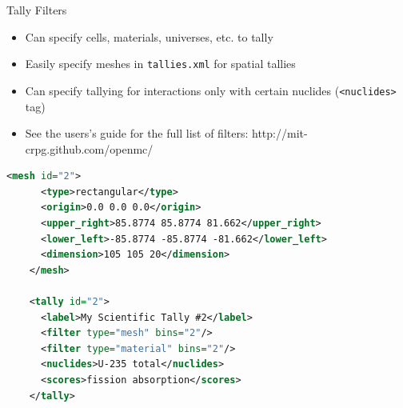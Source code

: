 \documentclass[serif]{beamer}
\begin{document}

\begin{frame}[fragile]{Tally Filters}

  \begin{itemize}
    \item Can specify cells, materials, universes, etc. to tally
    \item Easily specify meshes in \verb|tallies.xml| for spatial tallies
    \item Can specify tallying for interactions only with certain nuclides (\verb|<nuclides>| tag)
    \item See the users's guide for the full list of filters: http://mit-crpg.github.com/openmc/
  \end{itemize}

  \begin{scriptsize}
    \begin{lstlisting}[language=XML,gobble=4]
    <mesh id="2">
      <type>rectangular</type>
      <origin>0.0 0.0 0.0</origin>
      <upper_right>85.8774 85.8774 81.662</upper_right>
      <lower_left>-85.8774 -85.8774 -81.662</lower_left>
      <dimension>105 105 20</dimension>
    </mesh>
    
    <tally id="2">
      <label>My Scientific Tally #2</label>
      <filter type="mesh" bins="2"/>
      <filter type="material" bins="2"/>
      <nuclides>U-235 total</nuclides>
      <scores>fission absorption</scores>
    </tally>
    \end{lstlisting}
  \end{scriptsize}

\end{frame}


\end{document}
